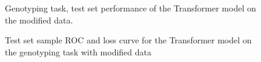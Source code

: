 \documentclass[bsc,frontabs,singlespacing,parskip,deptreport]{infthesis}
\begin{document}
\begin{figure}
\begin{center}
\setlength{\belowcaptionskip}{0pt}
\caption{Genotyping task, test set performance of the Transformer model on the modified data.}
\end{center}
\end{figure}

\begin{figure}
\begin{center}
\setlength{\belowcaptionskip}{0pt}
\caption{Test set sample ROC and loss curve for the Transformer model on the genotyping task with modified data}
\end{center}
\end{figure}
\end{document}
